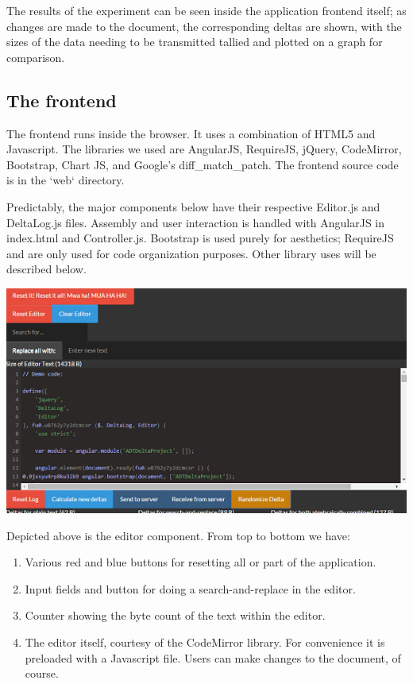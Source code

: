 \documentclass[12pt,a4paper]{article}
\begin{document}
		The results of the experiment can be seen inside the application frontend itself; as changes are made to the document, the corresponding deltas are shown, with the sizes of the data needing to be transmitted tallied and plotted on a graph for comparison.
		
		\subsection{The frontend}
		
		The frontend runs inside the browser. It uses a combination of HTML5 and Javascript. The libraries we used are AngularJS, RequireJS, jQuery, CodeMirror, Bootstrap, Chart JS, and Google’s diff\_match\_patch. The frontend source code is in the `web` directory. 
		
		Predictably, the major components below have their respective Editor.js and DeltaLog.js files. Assembly and user interaction is handled with AngularJS in index.html and Controller.js. Bootstrap is used purely for aesthetics; RequireJS and are only used for code organization purposes. Other library uses will be described below.
		
		\begin{center}\includegraphics{frontend0}\end{center}
		
		Depicted above is the editor component. From top to bottom we have:
		
		\begin{enumerate}
			\item Various red and blue buttons for resetting all or part of the application.
			\item Input fields and button for doing a search-and-replace in the editor.
			\item Counter showing the byte count of the text within the editor.
			\item The editor itself, courtesy of the CodeMirror library. For convenience it is preloaded with a Javascript file. Users can make changes to the document, of course.
		\end{enumerate}
		
\end{document}

